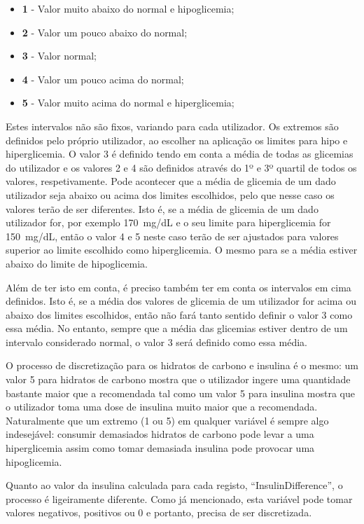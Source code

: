 \begin{itemize}
\item \textbf{1} - Valor muito abaixo do normal e hipoglicemia;
\item \textbf{2} - Valor um pouco abaixo do normal;
\item \textbf{3} - Valor normal;
\item \textbf{4} - Valor um pouco acima do normal;
\item \textbf{5} - Valor muito acima do normal e hiperglicemia;
\end{itemize}
Estes intervalos não são fixos, variando para cada utilizador. Os extremos são definidos pelo próprio utilizador, ao escolher na aplicação os limites para hipo e hiperglicemia. O valor 3 é definido tendo em conta a média de todas as glicemias do utilizador e os valores 2 e 4 são definidos através do 1º e 3º quartil de todos os valores, respetivamente. Pode acontecer que a média de glicemia de um dado utilizador seja abaixo ou acima dos limites escolhidos, pelo que nesse caso os valores terão de ser diferentes. Isto é, se a média de glicemia de um dado utilizador for, por exemplo 170~mg/dL e o seu limite para hiperglicemia for 150~mg/dL, então o valor 4 e 5 neste caso terão de ser ajustados para valores superior ao limite escolhido como hiperglicemia. O mesmo para se a média estiver abaixo do limite de hipoglicemia.

Além de ter isto em conta, é preciso também ter em conta os intervalos em cima definidos. Isto é, se a média dos valores de glicemia de um utilizador for acima ou abaixo dos limites escolhidos, então não fará tanto sentido definir o valor 3 como essa média. No entanto, sempre que a média das glicemias estiver dentro de um intervalo considerado normal, o valor 3 será definido como essa média.

O processo de discretização para os hidratos de carbono e insulina é o mesmo: um valor 5 para hidratos de carbono mostra que o utilizador ingere uma quantidade bastante maior que a recomendada tal como um valor 5 para insulina mostra que o utilizador toma uma dose de insulina muito maior que a recomendada. Naturalmente que um extremo (1 ou 5) em qualquer variável é sempre algo indesejável: consumir demasiados hidratos de carbono pode levar a uma hiperglicemia assim como tomar demasiada insulina pode provocar uma hipoglicemia.

Quanto ao valor da insulina calculada para cada registo, ``Insulin\textunderscore Difference'', o processo é ligeiramente diferente. Como já mencionado, esta variável pode tomar valores negativos, positivos ou 0 e portanto, precisa de ser discretizada.



